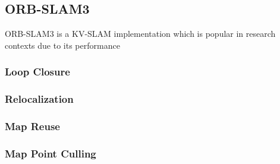 \subsection{ORB-SLAM3}

ORB-SLAM3 is a KV-SLAM implementation which is popular in research contexts due to its performance

\subsubsection{Loop Closure}
\subsubsection{Relocalization}
\subsubsection{Map Reuse}
\subsubsection{Map Point Culling}